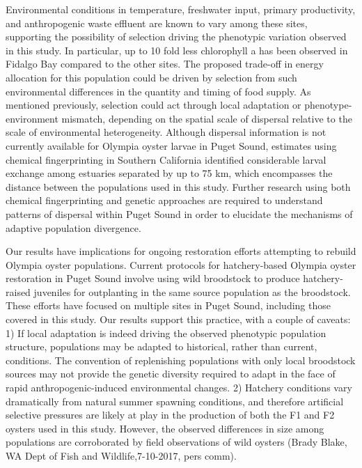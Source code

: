 \documentclass[fleqn,10pt]{wlscirep}
\begin{document}
Environmental conditions in temperature, freshwater input, primary productivity, and anthropogenic waste effluent are known to vary among these sites\cite{Heare2017-uv}, supporting the possibility of selection driving the phenotypic variation observed in this study. In particular, up to 10 fold less chlorophyll a has been observed in Fidalgo Bay compared to the other sites. The proposed trade-off in energy allocation for this population could be driven by selection from such environmental differences in the quantity and timing of food supply\cite{Heino1999-fb,Pontarp2015-oc}. As mentioned previously, selection could act through local adaptation or phenotype-environment mismatch, depending on the spatial scale of dispersal relative to the scale of environmental heterogeneity. Although dispersal information is not currently available for Olympia oyster larvae in Puget Sound, estimates using chemical fingerprinting in Southern California identified considerable larval exchange among estuaries separated by up to 75 km\cite{Carson2010-xi}, which encompasses the distance between the populations used in this study. Further research using both chemical fingerprinting and genetic approaches are required to understand patterns of dispersal within Puget Sound in order to elucidate the mechanisms of adaptive population divergence.\par
Our results have implications for ongoing restoration efforts attempting to rebuild Olympia oyster populations. Current protocols for hatchery-based Olympia oyster restoration in Puget Sound involve using wild broodstock to produce hatchery-raised juveniles for outplanting in the same source population as the broodstock\cite{Blake2012-ln}. These efforts have focused on multiple sites in Puget Sound, including those covered in this study. Our results support this practice, with a couple of caveats: 1) If local adaptation is indeed driving the observed phenotypic population structure, populations may be adapted to historical, rather than current, conditions. The convention of replenishing populations with only local broodstock sources may not provide the genetic diversity required to adapt in the face of rapid anthropogenic-induced environmental changes\cite{Jones2013-pe}. 2) Hatchery conditions vary dramatically from natural summer spawning conditions, and therefore artificial selective pressures are likely at play in the production of both the F1 and F2 oysters used in this study\cite{McClure2008-al}. However, the observed differences in size among populations are corroborated by field observations of wild oysters (Brady Blake, WA Dept of Fish and Wildlife,7-10-2017, pers comm).\par
\end{document}
